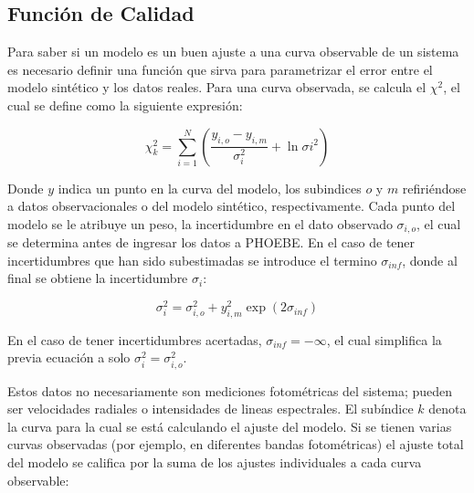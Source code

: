 \subsection{Función de Calidad}

Para saber si un modelo es un buen ajuste a una curva observable de un sistema
es necesario definir una función que sirva para parametrizar el error entre el
modelo sintético y los datos reales. Para una curva observada, se calcula el
$\chi^2$, el cual se define como la siguiente expresión:

\begin{eqfloat}[!ht]
	\centering
	\begin{equation}
		\chi_{k}^2 = \sum_{i=1}^{N}{\left(\frac{y_{i,o} - y_{i,m}}{\sigma_{i}^2} + \ln{\sigma{i}^2}\right)}
	\end{equation}
	\blankcaption
	\label{ecuacionPhoebeChi2Curva}
\end{eqfloat}

Donde $y$ indica un punto en la curva del modelo, los subindices $o$ y $m$
refiriéndose a datos observacionales o del modelo sintético, respectivamente.
Cada punto del modelo se le atribuye un peso, la incertidumbre en el dato
observado $\sigma_{i,o}$, el cual se determina antes de ingresar los datos a
PHOEBE. En el caso de tener incertidumbres que han sido subestimadas se
introduce el termino $\sigma_{inf}$, donde al final se obtiene la incertidumbre
$\sigma_{i}$:

\newpage

\begin{eqfloat}[!ht]
	\centering
	\begin{equation}
		\sigma_{i}^{2} = \sigma_{i,o}^{2} + y_{i,m}^{2} \exp{\left(2 \sigma_{inf}\right)}
	\end{equation}
\end{eqfloat}

En el caso de tener incertidumbres acertadas, $\sigma_{inf} = -\infty$, el cual
simplifica la previa ecuación a solo $\sigma_{i}^{2} = \sigma_{i,o}^{2}$.

Estos datos no necesariamente son mediciones fotométricas del sistema; pueden
ser velocidades radiales o intensidades de lineas espectrales. El subíndice $k$
denota la curva para la cual se está calculando el ajuste del modelo. Si se
tienen varias curvas observadas (por ejemplo, en diferentes bandas fotométricas)
el ajuste total del modelo se califica por la suma de los ajustes individuales a
cada curva observable:

